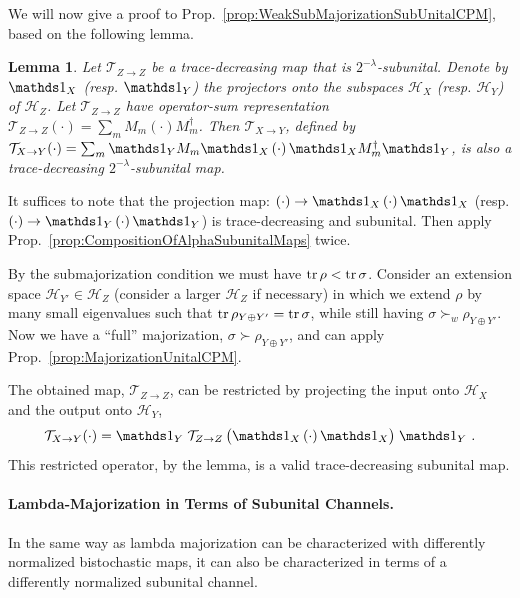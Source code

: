 \documentclass[11pt,a4paper]{article}
\theoremstyle{plain}
\newtheorem{lemma}[thm]{Lemma}
\def\Hs{\mathscr{H}}%
\newenvironment{myproof}[1][\proofname]{%
  \color{prooftextcolor} \footnotesize \proof[\itshape #1]\hspace*{1.2mm}%
}{\endproof}
\begin{document}
We will now give a proof to Prop.~\ref{prop:WeakSubMajorizationSubUnitalCPM}, based on the following lemma.
\begin{lemma}
  \label{lemma:AlphaSubUnitalCompWithProj}
  Let $\mathcal{T}_{Z\rightarrow Z}$ be a trace-decreasing map that is $2^{-\lambda}$-subunital. Denote by
  $\Ident_X$ (resp. $\Ident_Y$) the projectors onto the subspaces $\Hs_X$ (resp. $\Hs_Y$) of $\Hs_Z$. Let
  $\mathcal{T}_{Z\rightarrow Z}$ have operator-sum representation
  $\mathcal{T}_{Z\rightarrow Z}(\cdot) = \sum_m M_m\left(\cdot\right)M_m^\dagger$. Then
  $\mathcal{T}_{X\rightarrow Y}$, defined by
  $\mathcal{T}_{X\rightarrow Y}(\cdot) = \sum_m \Ident_Y M_m\Ident_X \left(\cdot\right) \Ident_X M_m^\dagger\Ident_Y$,
  is also a trace-decreasing $2^{-\lambda}$-subunital map.
\end{lemma}
\begin{myproof}[Proof of Lemma~\ref{lemma:AlphaSubUnitalCompWithProj}]
  It suffices to note that the projection map: $\left(\cdot\right) \rightarrow \Ident_X \left(\cdot\right) \Ident_X$
  (resp. $\left(\cdot\right) \rightarrow \Ident_Y \left(\cdot\right) \Ident_Y$) is trace-decreasing and subunital.
  Then apply Prop.~\ref{prop:CompositionOfAlphaSubunitalMaps} twice.
\end{myproof}

\begin{myproof}[Proof of Prop.~\ref{prop:WeakSubMajorizationSubUnitalCPM}]
  By the submajorization condition we must have $\operatorname{tr}\rho < \operatorname{tr}\sigma$. Consider an extension space
  $\Hs_{Y'}\in\Hs_Z$ (consider a larger $\Hs_Z$ if necessary) in which we extend $\rho$ by many small
  eigenvalues such that $\operatorname{tr} \rho_{Y\oplus Y'} = \operatorname{tr}\sigma$, while still having $\sigma \succ_w \rho_{Y\oplus Y'}$.
  Now we have a ``full'' majorization, $\sigma\succ\rho_{Y\oplus Y'}$, and can apply
  Prop.~\ref{prop:MajorizationUnitalCPM}.

  The obtained map, $\mathcal{T}_{Z\rightarrow Z}$, can be restricted by projecting the input onto $\Hs_X$
  and the output onto $\Hs_Y$,
  \begin{align*}
    \mathcal{T}_{X\rightarrow Y}(\cdot)
    = \Ident_Y\; \mathcal{T}_{Z\rightarrow Z}\,\bigl(\Ident_X \left(\cdot\right) \Ident_X \bigr)\; \Ident_Y\ .
  \end{align*}
  This restricted operator, by the lemma, is a valid trace-decreasing subunital map.
\end{myproof}

\paragraph{Lambda-Majorization in Terms of Subunital Channels.}
In the same way as lambda majorization can be characterized with differently normalized bistochastic maps,
it can also be characterized in terms of a differently normalized subunital channel.
\end{document}
